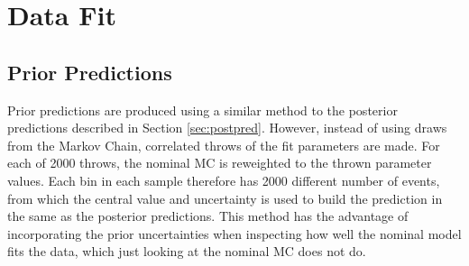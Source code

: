 \section{Data Fit}\label{sec:datafit}

\subsection{Prior Predictions}

Prior predictions are produced using a similar method to the posterior predictions described in Section \ref{sec:postpred}. However, instead of using draws from the Markov Chain, correlated throws of the fit parameters are made. For each of 2000 throws, the nominal MC is reweighted to the thrown parameter values. Each bin in each sample therefore has 2000 different number of events, from which the central value and uncertainty is used to build the prediction in the same as the posterior predictions. This method has the advantage of incorporating the prior uncertainties when inspecting how well the nominal model fits the data, which just looking at the nominal MC does not do. 

